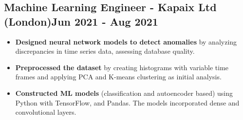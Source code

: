 \documentclass[]{article}
\begin{document}
\vspace{2ex}

\subsection{\large{Machine Learning Engineer - Kapaix Ltd} (London)\hfill{\small{Jun 2021 - Aug 2021}}}

\begin{itemize}
    \item \textbf{Designed neural network models to detect anomalies} by analyzing discrepancies in time series data, assessing database quality.
    \item \textbf{Preprocessed the dataset} by creating histograms with variable time frames and applying PCA and K-means clustering as initial analysis.
    \item \textbf{Constructed ML models} (classification and autoencoder based) using Python with TensorFlow, and Pandas. The models incorporated dense and convolutional layers.
\end{itemize}
\end{document}
